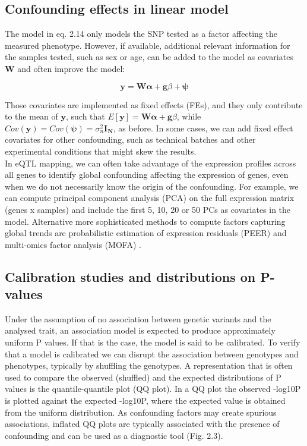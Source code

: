 \subsection{Confounding effects in linear model}

The model in eq. 2.14 only models the SNP tested as a factor affecting the measured phenotype.
However, if available, additional relevant information for the samples tested, such as sex or age, can be added to the model as covariates $\mathbf{W}$ and often improve the model:

\begin{equation}\label{eq21:Linear_regression_genetics_covariates}
 \mathbf{y} =  \mathbf{W}\boldsymbol{\alpha} + \mathbf{g}\beta + \boldsymbol{\psi} 
\end{equation}

Those covariates are implemented as fixed effects (FEs), and they only contribute to the mean of $\mathbf{y}$, such that $E[\mathbf{y}] = \mathbf{W}\boldsymbol{\alpha} + \mathbf{g}\beta$, while $Cov(\mathbf{y}) = Cov(\boldsymbol{\psi}) = \sigma_n^2 \mathbf{I_N} $, as before.
In some cases, we can add fixed effect covariates for other confounding, such as technical batches and other experimental conditions that might skew the results. \\

In eQTL mapping, we can often take advantage of the expression profiles across all genes to identify global confounding affecting the expression of genes, even when we do not necessarily know the origin of the confounding.
For example, we can compute principal component analysis (PCA) on the full expression matrix (genes x samples) and include the first 5, 10, 20 or 50 PCs as covariates in the model.
Alternative more sophisticated methods to compute factors capturing global trends are probabilistic estimation of expression residuals (PEER) \cite{stegle2010bayesian, stegle2012using} and multi-omics factor analysis (MOFA) \cite{argelaguet2018multi}. 

\subsection{Calibration studies and distributions on P-values}

Under the assumption of no association between genetic variants and the analysed trait, an association model is expected to produce approximately uniform P values.
If that is the case, the model is said to be calibrated.
To verify that a model is calibrated we can disrupt the association between genotypes and phenotypes, typically by shuffling the genotypes. 
A representation that is often used to compare the observed (shuffled) and the expected distributions of P values is the quantile-quantile plot (QQ plot). 
In a QQ plot the observed -log10P is plotted against the expected -log10P, where the expected value is obtained from the uniform distribution. 
As confounding factors may create spurious associations, inflated QQ plots are typically associated with the presence of confounding and can be used as a diagnostic tool (Fig. 2.3). 

